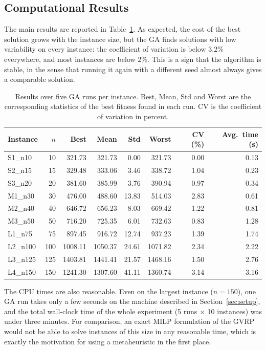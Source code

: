 \documentclass [a4paper, 11pt, titlepage] {article}
\begin{document}
\subsection{Computational Results}
\label{sec:compres}

The main results are reported in Table~\ref{tab:results}. As expected, the cost of the best solution grows with the instance size, but the GA finds solutions with low variability on every instance: the coefficient of variation is below $3.2\%$ everywhere, and most instances are below $2\%$. This is a sign that the algorithm is stable, in the sense that running it again with a different seed almost always gives a comparable solution.

\begin{table}[H]
\centering
\small
\begin{tabular}{|l|r|r|r|r|r|r|r|}
\hline
\textbf{Instance} & \textbf{$n$} & \textbf{Best} & \textbf{Mean} & \textbf{Std} & \textbf{Worst} & \textbf{CV (\%)} & \textbf{Avg.\ time (s)} \\
\hline
S1\_n10  &  10 &  321.73 &  321.73 &  0.00 &  321.73 & 0.00 & 0.13 \\
S2\_n15  &  15 &  329.48 &  333.06 &  3.46 &  338.72 & 1.04 & 0.23 \\
S3\_n20  &  20 &  381.60 &  385.99 &  3.76 &  390.94 & 0.97 & 0.34 \\
M1\_n30  &  30 &  476.00 &  488.60 & 13.83 &  514.03 & 2.83 & 0.61 \\
M2\_n40  &  40 &  646.72 &  656.23 &  8.03 &  669.42 & 1.22 & 0.81 \\
M3\_n50  &  50 &  716.20 &  725.35 &  6.01 &  732.63 & 0.83 & 1.28 \\
L1\_n75  &  75 &  897.45 &  916.72 & 12.74 &  937.23 & 1.39 & 1.74 \\
L2\_n100 & 100 & 1008.11 & 1050.37 & 24.61 & 1071.82 & 2.34 & 2.22 \\
L3\_n125 & 125 & 1403.81 & 1441.41 & 21.57 & 1468.16 & 1.50 & 2.76 \\
L4\_n150 & 150 & 1241.30 & 1307.60 & 41.11 & 1360.74 & 3.14 & 3.16 \\
\hline
\end{tabular}
\caption{Results over five GA runs per instance. Best, Mean, Std and Worst are the corresponding statistics of the best fitness found in each run. CV is the coefficient of variation in percent.}
\label{tab:results}
\end{table}

The CPU times are also reasonable. Even on the largest instance ($n = 150$), one GA run takes only a few seconds on the machine described in Section~\ref{sec:setup}, and the total wall-clock time of the whole experiment (5 runs $\times$ 10 instances) was under three minutes. For comparison, an exact MILP formulation of the GVRP would not be able to solve instances of this size in any reasonable time, which is exactly the motivation for using a metaheuristic in the first place.
\end{document}
